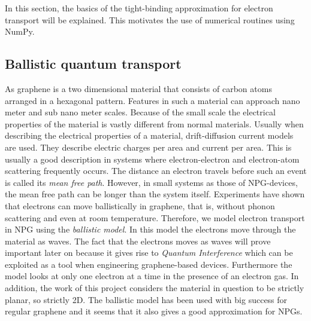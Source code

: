 In this section, the basics of the tight-binding approximation for electron transport will be explained. This motivates the use of numerical routines using NumPy.
\subsection{Ballistic quantum transport}
As graphene is a two dimensional material that consists of carbon atoms arranged in a hexagonal pattern. Features in such a material can approach nano meter and sub nano meter scales. Because of the small scale the electrical properties of the material is vastly different from normal materials. Usually when describing the electrical properties of a material, drift-diffusion current models are used. They describe electric charges per area and current per area. This is usually a good description in systems where electron-electron and electron-atom scattering frequently occurs. The distance an electron travels before such an event is called its \textit{mean free path}. However, in small systems as those of NPG-devices, the mean free path can be longer than the system itself. Experiments have shown that electrons can move ballistically in graphene\cite{mayorov_micrometer-scale_2011,baringhaus_exceptional_2014}, that is, without phonon scattering and even at room temperature. Therefore, we model electron transport in NPG using the \textit{ballistic model}. In this model the electrons move through the material as waves. The fact that the electrons moves as waves will prove important later on because it gives rise to \textit{Quantum Interference} which can be exploited as a tool when engineering graphene-based devices\cite{markussen_relation_2010}. Furthermore the model looks at only one electron at a time in the presence of an electron gas. In addition, the work of this project considers the material in question to be strictly planar, so strictly 2D.  The ballistic model has been used with big success for regular graphene and it seems that it also gives a good approximation for NPGs.
